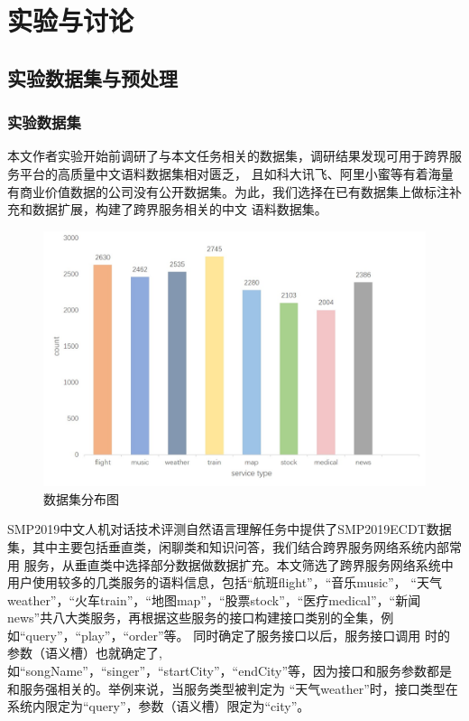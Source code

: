 \chapter{实验与讨论}

\section{实验数据集与预处理}
\subsection{实验数据集}
本文作者实验开始前调研了与本文任务相关的数据集，调研结果发现可用于跨界服务平台的高质量中文语料数据集相对匮乏，
且如科大讯飞、阿里小蜜等有着海量有商业价值数据的公司没有公开数据集。为此，我们选择在已有数据集上做标注补充和数据扩展，构建了跨界服务相关的中文
语料数据集。

\begin{figure}[htbp]
    \centering
    \includegraphics[width=15cm]{./images/count.jpg}
    \caption{数据集分布图}
    \label{fig:count}
  \end{figure}

SMP2019中文人机对话技术评测自然语言理解任务中提供了SMP2019ECDT数据集，其中主要包括垂直类，闲聊类和知识问答，我们结合跨界服务网络系统内部常用
服务，从垂直类中选择部分数据做数据扩充。本文筛选了跨界服务网络系统中用户使用较多的几类服务的语料信息，包括“航班flight”，“音乐music”，
“天气weather”，“火车train”，“地图map”，“股票stock”，“医疗medical”，“新闻news”共八大类服务，再根据这些服务的接口构建接口类别的全集，例如“query”，“play”，“order”等。
同时确定了服务接口以后，服务接口调用
时的参数（语义槽）也就确定了,如“songName”，“singer”，“startCity”，“endCity”等，因为接口和服务参数都是和服务强相关的。举例来说，当服务类型被判定为
“天气weather”时，接口类型在系统内限定为“query”，参数（语义槽）限定为“city”。

